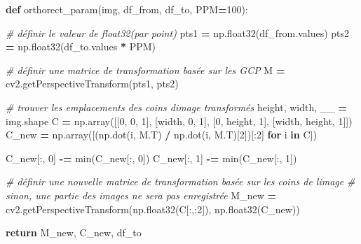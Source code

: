 \documentclass[
]{article}
\newenvironment{Shaded}{\begin{snugshade}}{\end{snugshade}}
\newcommand{\BuiltInTok}[1]{#1}
\newcommand{\CommentTok}[1]{\textcolor[rgb]{0.56,0.35,0.01}{\textit{#1}}}
\newcommand{\ControlFlowTok}[1]{\textcolor[rgb]{0.13,0.29,0.53}{\textbf{#1}}}
\newcommand{\DecValTok}[1]{\textcolor[rgb]{0.00,0.00,0.81}{#1}}
\newcommand{\KeywordTok}[1]{\textcolor[rgb]{0.13,0.29,0.53}{\textbf{#1}}}
\newcommand{\NormalTok}[1]{#1}
\newcommand{\OperatorTok}[1]{\textcolor[rgb]{0.81,0.36,0.00}{\textbf{#1}}}
\begin{document}
\begin{Shaded}
\begin{Highlighting}[]
\KeywordTok{def}\NormalTok{ orthorect\_param(img, df\_from, df\_to, PPM}\OperatorTok{=}\DecValTok{100}\NormalTok{):}
    
    \CommentTok{\# définir le valeur de float32(par point)}
\NormalTok{    pts1 }\OperatorTok{=}\NormalTok{ np.float32(df\_from.values)}
\NormalTok{    pts2 }\OperatorTok{=}\NormalTok{ np.float32(df\_to.values }\OperatorTok{*}\NormalTok{ PPM)}

    \CommentTok{\# définir une matrice de transformation basée sur les GCP}
\NormalTok{    M }\OperatorTok{=}\NormalTok{ cv2.getPerspectiveTransform(pts1, pts2)}

    \CommentTok{\# trouver les emplacements des coins d\textquotesingle{}image transformés}
\NormalTok{    height, width, \_\_ }\OperatorTok{=}\NormalTok{ img.shape}
\NormalTok{    C }\OperatorTok{=}\NormalTok{ np.array([[}\DecValTok{0}\NormalTok{, }\DecValTok{0}\NormalTok{, }\DecValTok{1}\NormalTok{],}
\NormalTok{                  [width, }\DecValTok{0}\NormalTok{, }\DecValTok{1}\NormalTok{],}
\NormalTok{                  [}\DecValTok{0}\NormalTok{, height, }\DecValTok{1}\NormalTok{],}
\NormalTok{                  [width, height, }\DecValTok{1}\NormalTok{]])}
\NormalTok{    C\_new }\OperatorTok{=}\NormalTok{ np.array([(np.dot(i, M.T) }\OperatorTok{/}\NormalTok{ np.dot(i, M.T)[}\DecValTok{2}\NormalTok{])[:}\DecValTok{2}\NormalTok{] }\ControlFlowTok{for}\NormalTok{ i }\KeywordTok{in}\NormalTok{ C])}

\NormalTok{    C\_new[:, }\DecValTok{0}\NormalTok{] }\OperatorTok{{-}=} \BuiltInTok{min}\NormalTok{(C\_new[:, }\DecValTok{0}\NormalTok{])}
\NormalTok{    C\_new[:, }\DecValTok{1}\NormalTok{] }\OperatorTok{{-}=} \BuiltInTok{min}\NormalTok{(C\_new[:, }\DecValTok{1}\NormalTok{])}
    
    \CommentTok{\# définir une nouvelle matrice de transformation basée sur les coins de l\textquotesingle{}image}
    \CommentTok{\# sinon, une partie des images ne sera pas enregistrée}
\NormalTok{    M\_new }\OperatorTok{=}\NormalTok{ cv2.getPerspectiveTransform(np.float32(C[:,:}\DecValTok{2}\NormalTok{]), np.float32(C\_new))}

    \ControlFlowTok{return}\NormalTok{ M\_new, C\_new, df\_to}
\end{Highlighting}
\end{Shaded}
\end{document}
